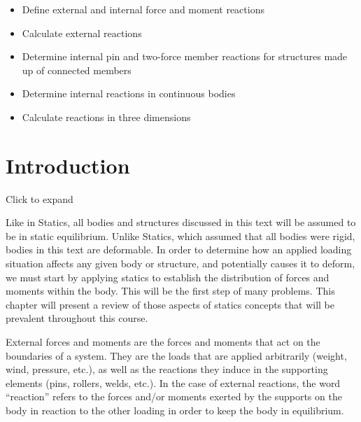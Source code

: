 \documentclass[
  letterpaper,
  DIV=11,
  numbers=noendperiod]{scrreprt}
\providecommand{\tightlist}{%
  \setlength{\itemsep}{0pt}\setlength{\parskip}{0pt}}\usepackage{longtable,booktabs,array}
\theoremstyle{definition}
\theoremstyle{remark}
\begin{document}
\begin{tcolorbox}[enhanced jigsaw, colback=white, colframe=quarto-callout-note-color-frame, toptitle=1mm, arc=.35mm, bottomrule=.15mm, toprule=.15mm, opacitybacktitle=0.6, title={Learning Objectives}, coltitle=black, breakable, colbacktitle=quarto-callout-note-color!10!white, bottomtitle=1mm, titlerule=0mm, opacityback=0, leftrule=.75mm, left=2mm, rightrule=.15mm]

\begin{itemize}
\tightlist
\item
  Define external and internal force and moment reactions
\item
  Calculate external reactions
\item
  Determine internal pin and two-force member reactions for structures
  made up of connected members
\item
  Determine internal reactions in continuous bodies
\item
  Calculate reactions in three dimensions
\end{itemize}

\end{tcolorbox}

\section*{Introduction}\label{introduction}


Click to expand

Like in Statics, all bodies and structures discussed in this text will
be assumed to be in static equilibrium. Unlike Statics, which assumed
that all bodies were rigid, bodies in this text are deformable. In order
to determine how an applied loading situation affects any given body or
structure, and potentially causes it to deform, we must start by
applying statics to establish the distribution of forces and moments
within the body. This will be the first step of many problems. This
chapter will present a review of those aspects of statics concepts that
will be prevalent throughout this course.

External forces and moments are the forces and moments that act on the
boundaries of a system. They are the loads that are applied arbitrarily
(weight, wind, pressure, etc.), as well as the reactions they induce in
the supporting elements (pins, rollers, welds, etc.). In the case of
external reactions, the word ``reaction'' refers to the forces and/or
moments exerted by the supports on the body in reaction to the other
loading in order to keep the body in equilibrium.
\end{document}
